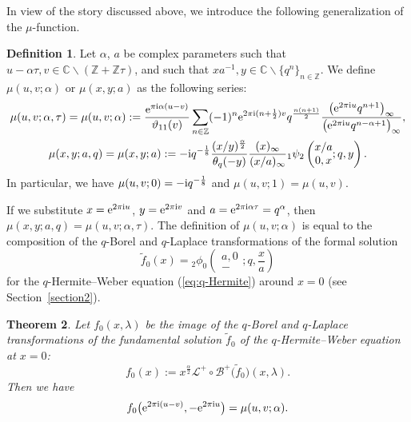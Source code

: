 \documentclass[pdftex]{sigma}
\numberwithin{equation}{section}
\newtheorem{thm}{Theorem}[section]
\theoremstyle{definition}
\newtheorem{dfn}[thm]{Definition}
\newcommand{\Zz}{\mathbb{Z}}
\newcommand{\Cz}{\mathbb{C}}
\begin{document}
In view of the story discussed above, we introduce the following generalization of the $\mu$-function.
\begin{dfn}\label{def:mua}
Let $\alpha $, $a$ be complex parameters such that $u-\alpha\tau,v\in\Cz\backslash(\Zz+\Zz\tau)$, and such that $xa^{-1}, y \in \mathbb{C} \backslash \{q^{n}\}_{n \in \mathbb{Z}}$.
We define $\mu(u,v;\alpha)$ or $\mu(x,y;a)$ as the following series:
\begin{gather*}
\mu(u,v;\alpha,\tau)
 =
 \mu(u,v;\alpha)
 :=
 \frac{{\rm e}^{\pi{\rm i}\alpha(u-v)}}{\vartheta_{11}(v)}
 \sum_{n\in\Zz}(-1)^n{\rm e}^{2\pi{\rm i}(n+\frac{1}{2})v}q^\frac{n(n+1)}{2}
 \frac{\big({\rm e}^{2\pi{\rm i}u}q^{n+1}\big)_{\infty }}{\big({\rm e}^{2\pi{\rm i}u}q^{n-\alpha +1}\big)_{\infty }}, \\
\mu(x,y;a,q)
 =
 \mu(x,y;a)
 :=
 -{\rm i}q^{-\frac{1}{8}}\frac{(x/y)^\frac{\alpha}{2}}{\theta_q(-y)}\frac{(x)_\infty}{(x/a)_\infty}
 {}_1\psi_2\left(\begin{matrix}x/a\\0,x\end{matrix};q,y\right).
\end{gather*}
In particular, we have $\mu(u,v;0)=-{\rm i}q^{-\frac{1}{8}}$ and $\mu(u,v;1)=\mu(u,v)$.
\end{dfn}
If we substitute $x={\rm e}^{2\pi{\rm i}u}$, $y={\rm e}^{2\pi{\rm i}v}$ and $a={\rm e}^{2\pi{\rm i}\alpha \tau }=q^{\alpha }$, then $\mu(x,y;a,q)=\mu(u,v;\alpha,\tau )$.
The definition of $\mu(u,v;\alpha)$ is equal to the composition of the $q$-Borel and $q$-Laplace transformations of the formal solution
\[
\widetilde{f}_{0}(x)
 =
 {}_2\phi_0\left(\begin{matrix}a,0 \\ - \end{matrix};q, {\frac{x}{a}}\right)
\]
for the $q$-Hermite--Weber equation (\ref{eq:q-Hermite}) around $x=0$ (see Section~\ref{section2}).
\begin{thm}\label{thm:mu and q-Hermite--Weber}
Let $f_{0}(x,\lambda )$ be the image of the $q$-Borel and $q$-Laplace transformations of the fundamental solution $\widetilde{f}_{0}$ of the $q$-Hermite--Weber equation at $x=0$:
\[
f_{0}(x)
 :=
 x^{\frac{\alpha }{2}}\mathcal{L}^{+}\circ\mathcal{B}^{+}\big(\widetilde{f}_{0}\big)(x,\lambda).
\]
Then we have
\begin{gather}\label{eq:mu and q-Hermite--Weber}
f_{0}\big({\rm e}^{2\pi{\rm i}(u-v)},-{\rm e}^{2\pi{\rm i}u}\big)
 =\mu(u,v;\alpha).
\end{gather}
\end{thm}
\end{document}
